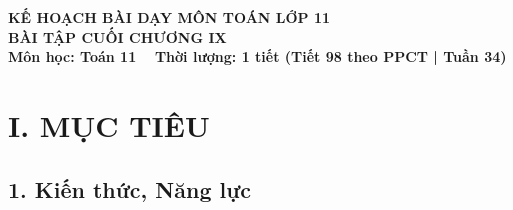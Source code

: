 \documentclass[12pt, a4paper]{article}
\begin{document}
\begin{center}
    {\fontsize{14pt}{17pt}\selectfont \textbf{KẾ HOẠCH BÀI DẠY MÔN TOÁN LỚP 11}}\\[6pt]
    {\fontsize{16pt}{19pt}\selectfont \textbf{BÀI TẬP CUỐI CHƯƠNG IX}}\\[4pt]
    {\fontsize{12pt}{15pt}\selectfont \textbf{Môn học: Toán 11} \ \textbar \ \textbf{Thời lượng: 1 tiết (Tiết 98 theo PPCT | Tuần 34)}}
\end{center}

\vspace{5pt}

\section*{I. MỤC TIÊU}

\subsection*{1. Kiến thức, Năng lực}
\end{document}
